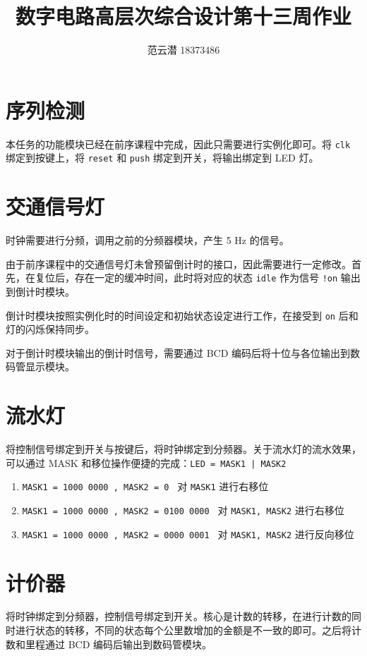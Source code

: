 \documentclass[lang=cn,11pt,a4paper,cite=authoryear]{elegantpaper}
\title{数字电路高层次综合设计\quad 第十三周作业}
\author{范云潜 18373486}
\institute{微电子学院 184111 班}
\date{\zhtoday}
\begin{document}
\maketitle

\tableofcontents

\section{序列检测}

本任务的功能模块已经在前序课程中完成，因此只需要进行实例化即可。将 \lstinline{clk} 绑定到按键上，将 \lstinline{reset} 和 \lstinline{push} 绑定到开关，将输出绑定到 LED 灯。

\section{交通信号灯}

时钟需要进行分频，调用之前的分频器模块，产生 5 Hz 的信号。

由于前序课程中的交通信号灯未曾预留倒计时的接口，因此需要进行一定修改。首先，在复位后，存在一定的缓冲时间，此时将对应的状态 \lstinline{idle} 作为信号 \lstinline{!on} 输出到倒计时模块。

倒计时模块按照实例化时的时间设定和初始状态设定进行工作，在接受到 \lstinline{on} 后和灯的闪烁保持同步。

对于倒计时模块输出的倒计时信号，需要通过 BCD 编码后将十位与各位输出到数码管显示模块。

\section{流水灯}

将控制信号绑定到开关与按键后，将时钟绑定到分频器。关于流水灯的流水效果，可以通过 MASK 和移位操作便捷的完成：\lstinline{LED = MASK1 | MASK2}

\begin{enumerate}
    \item \lstinline{MASK1 = 1000 0000 , MASK2 = 0 } 对 \lstinline{MASK1} 进行右移位
    \item \lstinline{MASK1 = 1000 0000 , MASK2 = 0100 0000 } 对 \lstinline{MASK1, MASK2} 进行右移位
    \item \lstinline{MASK1 = 1000 0000 , MASK2 = 0000 0001 } 对 \lstinline{MASK1, MASK2} 进行反向移位
\end{enumerate}

\section{计价器}

将时钟绑定到分频器，控制信号绑定到开关。核心是计数的转移，在进行计数的同时进行状态的转移，不同的状态每个公里数增加的金额是不一致的即可。之后将计数和里程通过 BCD 编码后输出到数码管模块。

\end{document}
